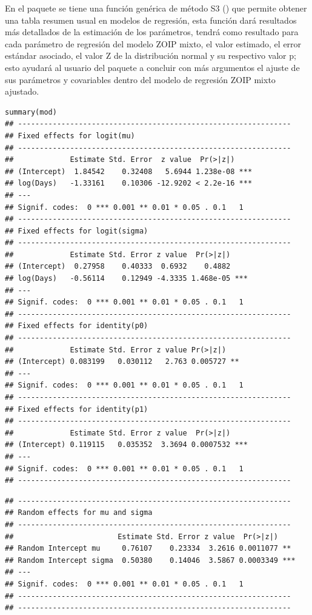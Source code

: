 En el paquete  se tiene una funci\'{o}n gen\'{e}rica de m\'{e}todo S3 () que permite obtener una tabla resumen usual en modelos de regresi\'{o}n, esta funci\'{o}n dar\'{a} resultados m\'{a}s detallados de la estimaci\'{o}n de los par\'{a}metros, tendr\'{a} como resultado para cada par\'{a}metro de regresi\'{o}n del modelo ZOIP mixto, el valor estimado, el error est\'{a}ndar asociado, el valor Z de la distribuci\'{o}n normal y su respectivo valor p; esto ayudar\'{a} al usuario del paquete  a concluir con m\'{a}s argumentos el ajuste de sus par\'{a}metros y covariables dentro del modelo de regresi\'{o}n ZOIP mixto ajustado.


\begin{verbatim}
summary(mod)
## ---------------------------------------------------------------
## Fixed effects for logit(mu) 
## ---------------------------------------------------------------
##             Estimate Std. Error  z value  Pr(>|z|)    
## (Intercept)  1.84542    0.32408   5.6944 1.238e-08 ***
## log(Days)   -1.33161    0.10306 -12.9202 < 2.2e-16 ***
## ---
## Signif. codes:  0 *** 0.001 ** 0.01 * 0.05 . 0.1   1
## ---------------------------------------------------------------
## Fixed effects for logit(sigma) 
## ---------------------------------------------------------------
##             Estimate Std. Error z value  Pr(>|z|)    
## (Intercept)  0.27958    0.40333  0.6932    0.4882    
## log(Days)   -0.56114    0.12949 -4.3335 1.468e-05 ***
## ---
## Signif. codes:  0 *** 0.001 ** 0.01 * 0.05 . 0.1   1
## ---------------------------------------------------------------
## Fixed effects for identity(p0) 
## ---------------------------------------------------------------
##             Estimate Std. Error z value Pr(>|z|)   
## (Intercept) 0.083199   0.030112   2.763 0.005727 **
## ---
## Signif. codes:  0 *** 0.001 ** 0.01 * 0.05 . 0.1   1
## ---------------------------------------------------------------
## Fixed effects for identity(p1) 
## ---------------------------------------------------------------
##             Estimate Std. Error z value  Pr(>|z|)    
## (Intercept) 0.119115   0.035352  3.3694 0.0007532 ***
## ---
## Signif. codes:  0 *** 0.001 ** 0.01 * 0.05 . 0.1   1
## ---------------------------------------------------------------
\end{verbatim}
\begin{verbatim}
## ---------------------------------------------------------------
## Random effects for mu and sigma 
## ---------------------------------------------------------------
##                        Estimate Std. Error z value  Pr(>|z|)    
## Random Intercept mu     0.76107    0.23334  3.2616 0.0011077 ** 
## Random Intercept sigma  0.50380    0.14046  3.5867 0.0003349 ***
## ---
## Signif. codes:  0 *** 0.001 ** 0.01 * 0.05 . 0.1   1
## ---------------------------------------------------------------
## ---------------------------------------------------------------
\end{verbatim}

